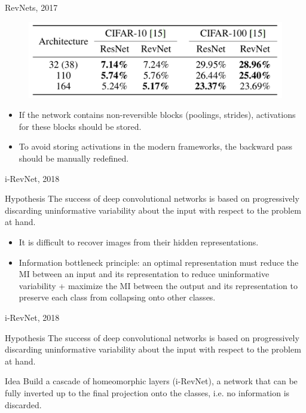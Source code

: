 \documentclass{beamer}
\begin{document}
\begin{frame}{RevNets, 2017}
	\begin{figure}
		\centering
		\includegraphics[width=0.8\linewidth]{figs/revnet_results.png}
	\end{figure}
	\begin{itemize}
		\item If the network contains non-reversible blocks (poolings, strides), activations for these blocks should be stored.
		\item To avoid storing activations in the modern frameworks, the backward pass should be manually redefined.
	\end{itemize}
\end{frame}
\begin{frame}{i-RevNet, 2018}
	\begin{block}{Hypothesis}
		The success of deep convolutional networks is based on progressively discarding uninformative variability about the input with respect to the problem at hand. 
	\end{block}
	\begin{itemize}
		\item It is difficult to recover images from their hidden representations. 
		\item Information bottleneck principle: an optimal representation must reduce the MI between an input and its representation to reduce uninformative variability + maximize the MI between the output and its representation to preserve each class from collapsing onto other classes.
	\end{itemize}
\end{frame}
\begin{frame}{i-RevNet, 2018}
	\begin{block}{Hypothesis}
		The success of deep convolutional networks is based on progressively discarding uninformative variability about the input with respect to the problem at hand. 
	\end{block}
	
	\begin{block}{Idea}
		Build a cascade of homeomorphic layers (i-RevNet), a network that can be fully inverted up to the final projection onto the classes, i.e. no information is discarded.
	\end{block}
\end{frame}
\end{document}
